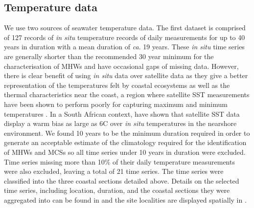 \documentclass[a4paper,10pt,review]{elsarticle}
\begin{document}
\subsection{Temperature data}
We use two sources of seawater temperature data. The first dataset is comprised of 127 records of \emph{in situ} temperature records of daily measurements for up to 40 years in duration with a mean duration of \emph{ca}. 19 years. These \emph{in situ} time series are generally shorter than the recommended 30 year minimum for the characterisation of MHWs \citep{Hobday2016} and have occasional gaps of missing data. However, there is clear benefit of using \emph{in situ} data over satellite data as they give a better representation of the temperatures felt by coastal ecosystems as well as the thermal characteristics near the coast, a region where satellite SST measurements have been shown to perform poorly for capturing maximum and minimum temperatures \citep[e.g.][]{Smale2009, Castillo2010}. In a South African context, \citet{Smit2013} have shown that satellite SST data display a warm bias as large as 6\degree C over \emph{in situ} temperatures in the nearshore environment. We found 10 years to be the minimum duration required in order to generate an acceptable estimate of the climatology required for the identification of MHWs and MCSs so all time series under 10 years in duration were excluded. Time series missing more than 10\% of their daily temperature measurements were also excluded, leaving a total of 21 time series. The time series were classified into the three coastal sections detailed above. Details on the selected time series, including location, duration, and the coastal sections they were aggregated into can be found in  and the site localities are displayed spatially in .
\end{document}
